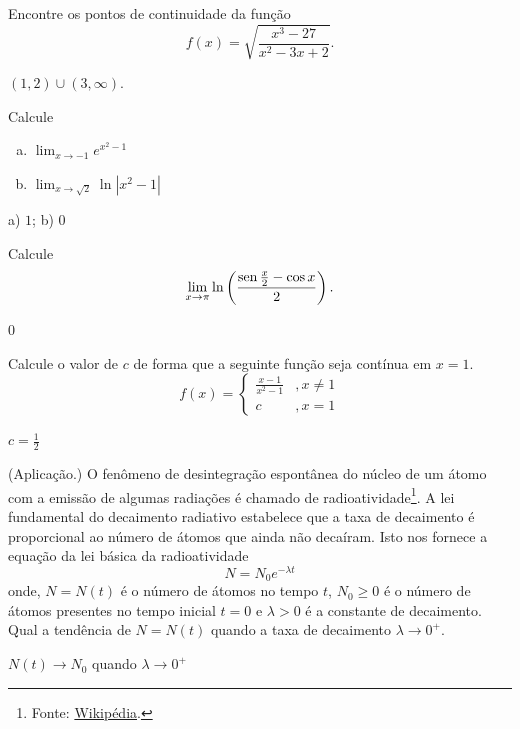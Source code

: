 \begin{exer}
  Encontre os pontos de continuidade da função
  \begin{equation}
    f(x) = \sqrt{\frac{x^3 - 27}{x^2 - 3x + 2}}.
  \end{equation}
\end{exer}
\begin{resp}
  $(1, 2)\cup (3, \infty)$.
\end{resp}

\begin{exer}
  Calcule
  \begin{enumerate}[a)]
  \item $\displaystyle\lim_{x\to -1}e^{x^2-1}$
  \item $\displaystyle\lim_{x\to \sqrt{2}}\ln |x^2-1|$
  \end{enumerate}
\end{exer}
\begin{resp}
  a) $1$; b) $0$
\end{resp}

\begin{exer}
  Calcule
  \begin{equation}
    \lim_{x\to \pi} \ln \left(\frac{\operatorname{sen} \frac{x}{2} - \cos x}{2}\right).
  \end{equation}
\end{exer}
\begin{resp}
  $0$
\end{resp}

\begin{exer}
  Calcule o valor de $c$ de forma que a seguinte função seja contínua em $x=1$.
  \begin{equation}
    f(x) = \left\{
      \begin{array}{ll}
        \frac{x-1}{x^2-1} &, x\neq 1\\
        c &, x=1
      \end{array}\right.
  \end{equation}
\end{exer}
\begin{resp}
  $c=\frac{1}{2}$
\end{resp}

\begin{exer}(Aplicação.)
  O fenômeno de desintegração espontânea do núcleo de um átomo com a emissão de algumas radiações é chamado de radioatividade\footnote{Fonte: \href{https://pt.wikipedia.org/wiki/Radioatividade}{Wikipédia}.}. A lei fundamental do decaimento radiativo estabelece que a taxa de decaimento é proporcional ao número de átomos que ainda não decaíram. Isto nos fornece a equação da lei básica da radioatividade
  \begin{equation}
    N = N_0e^{-\lambda t}
  \end{equation}
  onde, $N = N(t)$ é o número de átomos no tempo $t$, $N_0\geq 0$ é o número de átomos presentes no tempo inicial $t=0$ e $\lambda>0$ é a constante de decaimento. Qual a tendência de $N = N(t)$ quando a taxa de decaimento $\lambda\to 0^+$.
\end{exer}
\begin{resp}
  $N(t)\to N_0$ quando $\lambda\to 0^+$
\end{resp}

